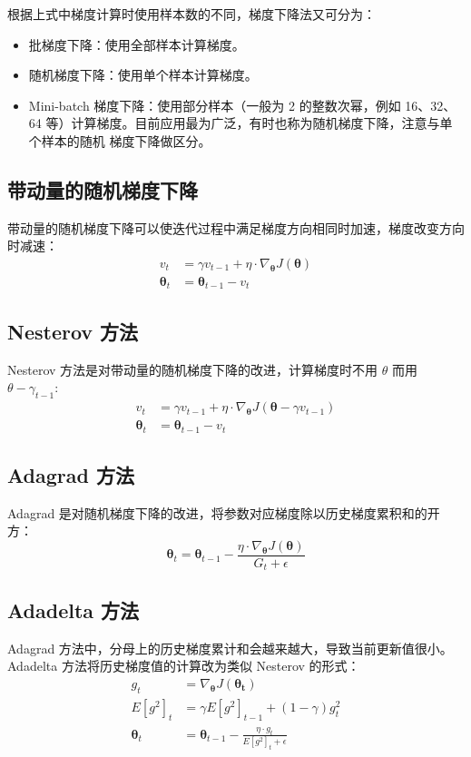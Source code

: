 根据上式中梯度计算时使用样本数的不同，梯度下降法又可分为：
\begin{itemize}
  \item 批梯度下降：使用全部样本计算梯度。
  \item 随机梯度下降：使用单个样本计算梯度。
  \item Mini-batch 梯度下降：使用部分样本（一般为 2 的整数次幂，例如 16、32、64
    等）计算梯度。目前应用最为广泛，有时也称为随机梯度下降，注意与单个样本的随机
    梯度下降做区分。
\end{itemize}

\subsection{带动量的随机梯度下降}
带动量的随机梯度下降可以使迭代过程中满足梯度方向相同时加速，梯度改变方向时减速：
\begin{align}
  v_t & = \gamma v_{t-1} + \eta \cdot \nabla_{\boldsymbol{\theta}}J(\boldsymbol{\theta}) \\
  \boldsymbol{\theta}_{t} & = \boldsymbol{\theta}_{t-1} - v_t
\end{align}

\subsection{Nesterov 方法}
Nesterov 方法是对带动量的随机梯度下降的改进，计算梯度时不用 $\theta$ 而用
$\theta - \gamma_{t-1}$:
\begin{align}
  v_t & = \gamma v_{t-1} + \eta \cdot \nabla_{\boldsymbol{\theta}}J(\boldsymbol{\theta}-\gamma v_{t-1}) \\
  \boldsymbol{\theta}_{t} & = \boldsymbol{\theta}_{t-1} - v_t
\end{align}

\subsection{Adagrad 方法}
Adagrad 是对随机梯度下降的改进，将参数对应梯度除以历史梯度累积和的开方：
\begin{equation}
  \boldsymbol{\theta}_{t} = \boldsymbol{\theta}_{t-1} - \frac{\eta \cdot \nabla_{\boldsymbol{\theta}}J(\boldsymbol{\theta})}{G_t + \epsilon}
\end{equation}

\subsection{Adadelta 方法}
Adagrad 方法中，分母上的历史梯度累计和会越来越大，导致当前更新值很小。Adadelta
方法将历史梯度值的计算改为类似 Nesterov 的形式：
\begin{align}
  g_t & = \nabla_{\boldsymbol{\theta}}J(\boldsymbol{\theta_t}) \\
  E[g^2]_t & = \gamma E[g^2]_{t-1} + (1-\gamma)g_t^2 \\
  \boldsymbol{\theta}_{t} & = \boldsymbol{\theta}_{t-1} - \frac{\eta \cdot g_t}{E[g^2]_t+\epsilon}
\end{align}

